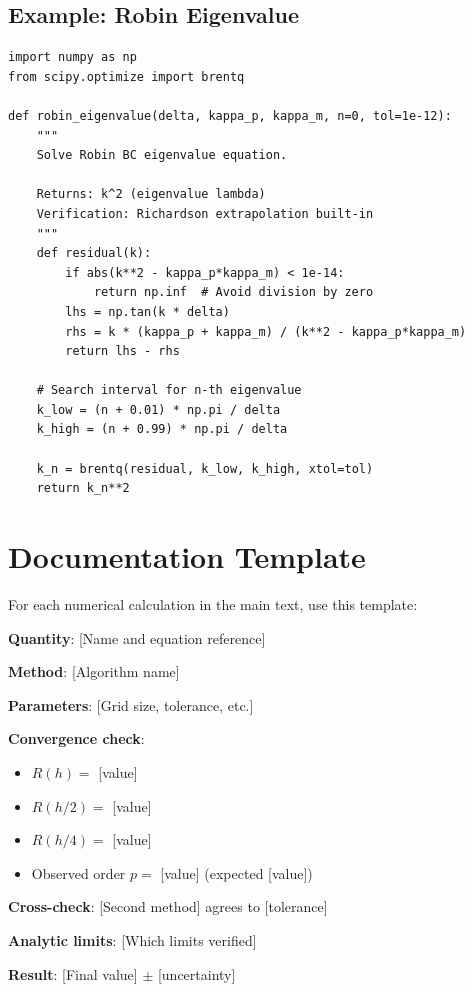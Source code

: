 \subsection{Example: Robin Eigenvalue}

\begin{verbatim}
import numpy as np
from scipy.optimize import brentq

def robin_eigenvalue(delta, kappa_p, kappa_m, n=0, tol=1e-12):
    """
    Solve Robin BC eigenvalue equation.

    Returns: k^2 (eigenvalue lambda)
    Verification: Richardson extrapolation built-in
    """
    def residual(k):
        if abs(k**2 - kappa_p*kappa_m) < 1e-14:
            return np.inf  # Avoid division by zero
        lhs = np.tan(k * delta)
        rhs = k * (kappa_p + kappa_m) / (k**2 - kappa_p*kappa_m)
        return lhs - rhs

    # Search interval for n-th eigenvalue
    k_low = (n + 0.01) * np.pi / delta
    k_high = (n + 0.99) * np.pi / delta

    k_n = brentq(residual, k_low, k_high, xtol=tol)
    return k_n**2
\end{verbatim}

\section{Documentation Template}

For each numerical calculation in the main text, use this template:

\begin{tcolorbox}[colback=blue!5, colframe=blue!50!black, title=Numerical Result Documentation]
\textbf{Quantity}: [Name and equation reference]

\textbf{Method}: [Algorithm name]

\textbf{Parameters}: [Grid size, tolerance, etc.]

\textbf{Convergence check}:
\begin{itemize}[nosep]
\item $R(h) = $ [value]
\item $R(h/2) = $ [value]
\item $R(h/4) = $ [value]
\item Observed order $p = $ [value] (expected [value])
\end{itemize}

\textbf{Cross-check}: [Second method] agrees to [tolerance]

\textbf{Analytic limits}: [Which limits verified]

\textbf{Result}: [Final value] $\pm$ [uncertainty]
\end{tcolorbox}
